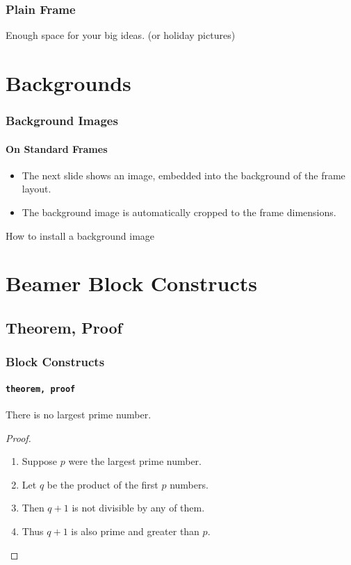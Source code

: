 %

\begin{frame}[c,plain]
        \frametitle{Plain Frame}
        \begin{center}
                {\tiny Enough} {\scriptsize space} for {\Large your} {\huge big} {\Huge ideas.} {\TINY (or holiday pictures)}
        \end{center}
\end{frame}

\section{Backgrounds}
\begin{frame}[fragile]
    \frametitle{Background Images}
    \framesubtitle{On Standard Frames}
    \begin{itemize}
      \item The next slide shows an image, embedded into the background of the frame layout.
      \item The background image is automatically cropped to the frame dimensions.
    \end{itemize}
    \begin{block}{How to install a background image}
        \scriptsize
        
    \end{block}
\end{frame}



\section{Beamer Block Constructs}
\subsection{Theorem, Proof}
\begin{frame}
        \frametitle{Block Constructs}
        \framesubtitle{{\tt theorem, proof}}
        \begin{theorem}
        There is no largest prime number.
        \end{theorem}

        \begin{proof}
                \begin{enumerate}
                        \item<1-| alert@1> Suppose $p$ were the largest prime number.
                        \item<2-> Let $q$ be the product of the first $p$ numbers.
                        \item<3-> Then $q+1$ is not divisible by any of them.
                        \item<1-> Thus $q+1$ is also prime and greater than $p$.\qedhere
                \end{enumerate}
        \end{proof}
\end{frame}

